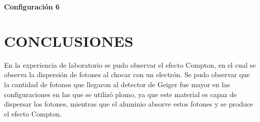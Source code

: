 \documentclass[a4paper]{article}
\begin{document}
    \begin{center}
        \textbf{Configuración 6}\\
    \end{center}

    \section{CONCLUSIONES}

    \indent En la experiencia de laboratorio se pudo observar el efecto Compton, en el cual se observa la dispersión de fotones al chocar con un electrón. Se pudo observar que la cantidad de fotones que llegaron al detector de Geiger fue mayor en las configuraciones en las que se utilizó plomo, ya que este material es capaz de dispersar los fotones, mientras que el aluminio absorve estos fotones y se produce el efecto Compton.\\
\end{document}
